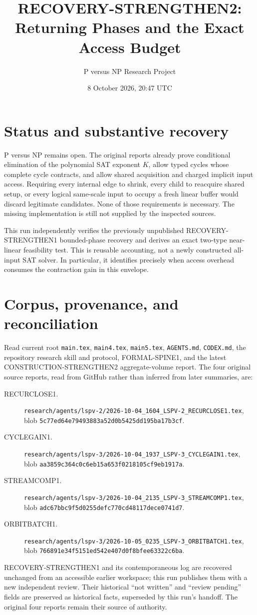 \documentclass[11pt]{article}
\title{RECOVERY-STRENGTHEN2: Returning Phases and the Exact Access Budget}
\author{P versus NP Research Project}
\date{8 October 2026, 20:47 UTC}
\begin{document}
\maketitle

\section*{Status and substantive recovery}
P versus NP remains open. The original reports already prove conditional
elimination of the polynomial SAT exponent $K$, allow typed cycles whose
complete cycle contracts, and allow shared acquisition and charged implicit
input access. Requiring every internal edge to shrink, every child to reacquire
shared setup, or every logical same-scale input to occupy a fresh linear buffer
would discard legitimate candidates. None of those requirements is necessary.
The missing implementation is still not supplied by the inspected sources.

This run independently verifies the previously unpublished
RECOVERY-STRENGTHEN1 bounded-phase recovery and derives an exact two-type
near-linear feasibility test. This is reusable accounting, not a newly
constructed all-input SAT solver. In particular, it identifies precisely when
access overhead consumes the contraction gain in this envelope.

\section*{Corpus, provenance, and reconciliation}
Read current root \nolinkurl{main.tex}, \nolinkurl{main4.tex},
\nolinkurl{main5.tex}, \nolinkurl{AGENTS.md}, \nolinkurl{CODEX.md}, the
repository research skill and protocol, FORMAL-SPINE1, and the latest
CONSTRUCTION-STRENGTHEN2 aggregate-volume report. The four original source
reports, read from GitHub rather than inferred from later summaries, are:
\begin{description}
\item[RECURCLOSE1.] \nolinkurl{research/agents/lspv-2/2026-10-04_1604_LSPV-2_RECURCLOSE1.tex},
blob \nolinkurl{5c77ed64e79493883a52d0b5425dd195ba17b3cf}.
\item[CYCLEGAIN1.] \nolinkurl{research/agents/lspv-3/2026-10-04_1937_LSPV-3_CYCLEGAIN1.tex},
blob \nolinkurl{aa3859c364c0c6eb15a653f0218105cf9eb1917a}.
\item[STREAMCOMP1.] \nolinkurl{research/agents/lspv-3/2026-10-04_2135_LSPV-3_STREAMCOMP1.tex},
blob \nolinkurl{adc67bbc9f5d0255defc770cd48117dece0741d7}.
\item[ORBITBATCH1.] \nolinkurl{research/agents/lspv-3/2026-10-05_0235_LSPV-3_ORBITBATCH1.tex},
blob \nolinkurl{766891e34f5151ed542e407d0f8bfee63322c6ba}.
\end{description}
RECOVERY-STRENGTHEN1 and its contemporaneous log are recovered unchanged
from an accessible earlier workspace; this run publishes them with a new
independent review. Their historical ``not written'' and ``review pending''
fields are preserved as historical facts, superseded by this run's handoff.
The original four reports remain their source of authority.
\end{document}
